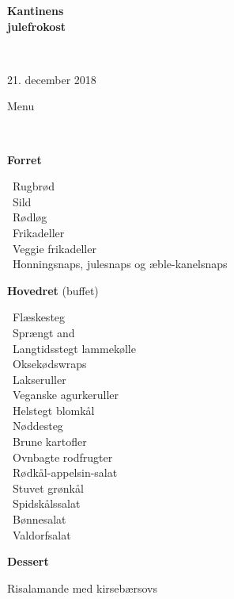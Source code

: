 \begin{center}
\begin{HUGE}
\textbf{Kantinens \\[3mm] julefrokost}
\end{HUGE}
\\[.6cm]
\begin{Large}
21. december 2018
\end{Large}
\end{center}
\vspace*{.01cm}
\begin{center}
\begin{huge}
Menu
\end{huge}
\\[.1cm]
\end{center}
\newcommand{\course}[1]{\vspace*{4mm} \textbf{#1} \vspace{-7mm}}
\newcommand{\goodindent}{\null\hspace{23mm}}
{\small
\vspace{-0.5cm}
\begin{center}
\course{Forret}
\end{center}
  \goodindent~Rugbrød
\\\goodindent~Sild
\\\goodindent~Rødløg
\\\goodindent~Frikadeller
\\\goodindent~Veggie frikadeller
\\\goodindent~Honningsnaps, julesnaps og æble-kanelsnaps

\begin{center}
\vspace{-0.2cm}
\course{Hovedret} (buffet)
\end{center}
  \goodindent~Flæskesteg
\\\goodindent~Sprængt and
\\\goodindent~Langtidsstegt lammekølle
\\\goodindent~Oksekødswraps
\\\goodindent~Lakseruller
\\\goodindent~Veganske agurkeruller
\\\goodindent~Helstegt blomkål
\\\goodindent~Nøddesteg
\\\goodindent~Brune kartofler
\\\goodindent~Ovnbagte rodfrugter
\\\goodindent~Rødkål-appelsin-salat
\\\goodindent~Stuvet grønkål
\\\goodindent~Spidskålssalat
\\\goodindent~Bønnesalat
\\\goodindent~Valdorfsalat

\begin{center}
\vspace{-0.2cm}
\course{Dessert}
\end{center}
  \goodindent Risalamande med kirsebærsovs
}
